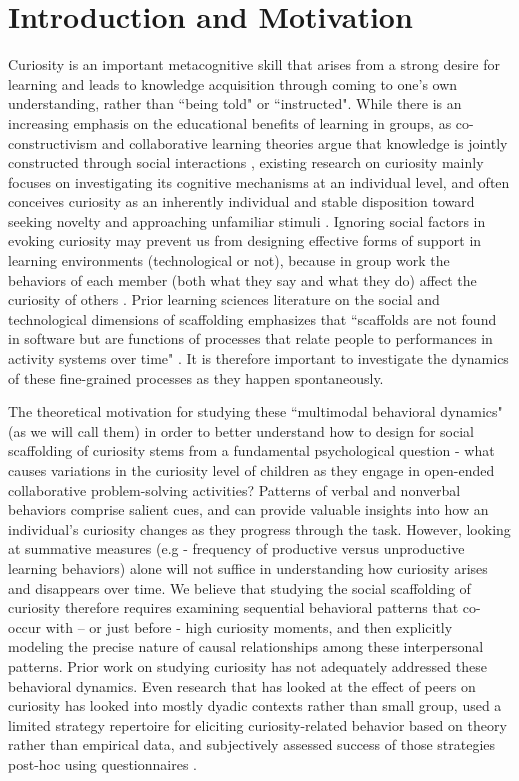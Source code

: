 \documentclass{llncs}
\begin{document}
\section{Introduction and Motivation}
\vspace{-0.4cm}
Curiosity is an important metacognitive skill that arises from a strong desire for learning \cite{berlyne1960conflict} and leads to knowledge acquisition through coming to one’s own understanding, rather than ``being told" or ``instructed". While there is an increasing emphasis on the educational benefits of learning in groups, as co-constructivism and collaborative learning theories argue that knowledge is jointly constructed through social interactions \cite{chi2014icap}, existing research on curiosity mainly focuses on investigating its cognitive mechanisms at an individual level, and often conceives curiosity as an inherently individual and stable disposition toward seeking novelty and approaching unfamiliar stimuli \cite{grossnickle2016disentangling}. Ignoring social factors in evoking curiosity may prevent us from designing effective forms of support in learning environments (technological or not), because in group work the behaviors of each member (both what they say and what they do) affect the curiosity of others \cite{forsyth2009group}. Prior learning sciences literature on the social and technological dimensions of scaffolding emphasizes that ``scaffolds are not found in software but are functions of processes that relate people to performances in activity systems over time" \cite{pea2004social}. It is therefore important to investigate the dynamics of these fine-grained processes as they happen spontaneously.

The theoretical motivation for studying these ``multimodal behavioral dynamics" (as we will call them) in order to better understand how to design for social scaffolding of curiosity stems from a fundamental psychological question - what causes variations in the curiosity level of children as they engage in open-ended collaborative problem-solving activities? Patterns of verbal and nonverbal behaviors comprise salient cues, and can provide valuable insights into how an individual's curiosity changes as they progress through the task. However, looking at summative measures (e.g - frequency of productive versus unproductive learning behaviors) alone will not suffice in understanding how curiosity arises and disappears over time. We believe that studying the social scaffolding of curiosity therefore requires examining sequential behavioral patterns that co-occur with – or just before - high curiosity moments, and then explicitly modeling the precise nature of causal relationships among these interpersonal patterns. Prior work on studying curiosity has not adequately addressed these behavioral dynamics. Even research that has looked at the effect of peers on curiosity has looked into mostly dyadic contexts rather than small group, used a limited strategy repertoire for eliciting curiosity-related behavior based on theory rather than empirical data, and subjectively assessed success of those strategies post-hoc using questionnaires \cite{graesser1995collaborative,gordon2015can,wu2013modeling}.
\end{document}
